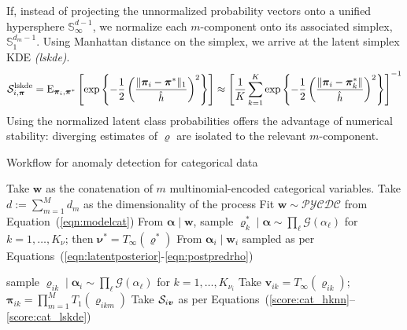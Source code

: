 If, instead of projecting the unnormalized probability vectors onto a unified 
    hypersphere $\mathbb{S}_{\infty}^{d-1}$, we normalize each $m$-component 
    onto its associated simplex, $\mathbb{S}_1^{d_m - 1}$.  Using Manhattan distance on the simplex, we 
    arrive at the latent simplex KDE \emph{(lskde)}.
    \begin{equation}
        \label{score:cat_lskde}
        \mathcal{S}_{i,\bm{\pi}}^{\text{lskde}} = \text{E}_{\bm{\pi}_i,\bm{\pi}^*}\left[\exp\left\lbrace
        -\frac{1}{2}\left(
        \frac{\lVert \bm{\pi}_i - \bm{\pi}^*\rVert_1}{\hat{h}}
        \right)^2
        \right\rbrace
        \right]
        \approx \left[
            \frac{1}{K}\sum_{k = 1}^K\exp\left\lbrace
            -\frac{1}{2}\left(\frac{\lVert \bm{\pi}_i - \bm{\pi}_k^*\rVert}{\hat{h}}\right)^2
            \right\rbrace
        \right]^{-1}
    \end{equation}
    Using the normalized latent class probabilities offers the advantage of
    numerical stability: diverging estimates of $\varrho$ are isolated to the
    relevant $m$-component.

\begin{algorithm}[htb]
    \caption{Workflow for anomaly detection for categorical data}\label{alg:adcat}
    \begin{algorithmic}[1]
        \State Take $\bm{w}$ as the conatenation of $m$ multinomial-encoded categorical variables.
        \State Take $d := \sum_{m = 1}^M d_m$ as the dimensionality of the process
        \State Fit $\bm{w}\sim\mathcal{PYCDC}$ from Equation~(\ref{eqn:modelcat})
        \State From $\bm{\alpha}\mid\bm{w}$, sample $\bm{\varrho}_k^*\mid\bm{\alpha}\sim \prod_{\ell}\mathcal{G}(\alpha_{\ell})$ for $k = 1,\ldots,K_{\nu}$; then $\bm{\nu}^* = T_{\infty}(\bm{\varrho}^*)$
        \State From $\bm{\alpha}_i\mid\bm{w}_i$ sampled as per Equations~(\ref{eqn:latentposterior}-\ref{eqn:postpredrho})
        
        sample $\bm{\varrho}_{ik}\mid\bm{\alpha}_{i}\sim\prod_{\ell}\mathcal{G}(\alpha_{\ell})$ for $k = 1,\ldots,K_{\nu_i}$
        \State Take $\bm{v}_{ik} = T_{\infty}(\bm{\varrho}_{ik})$;\hspace{0.15cm}
            $\bm{\pi}_{ik} = \prod_{m = 1}^MT_{1}(\bm{\varrho}_{ikm})$
        \State Take $\mathcal{S}_{i\bm{v}}$ as per Equations~(\ref{score:cat_hknn}--\ref{score:cat_lskde})
    \end{algorithmic}
\end{algorithm}




